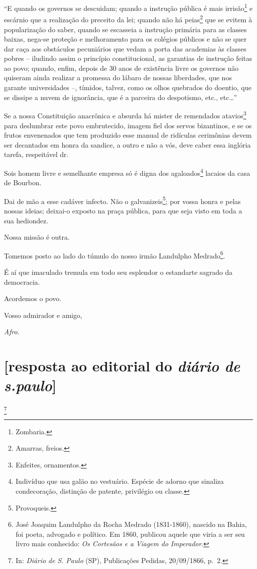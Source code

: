 ``E quando os governos se descuidam; quando a instrução pública é mais
irrisão\footnote{Zombaria.} e escárnio que a realização do preceito da
lei; quando não há peias\footnote{Amarras, freios.} que se evitem à
popularização do saber, quando se escasseia a instrução primária para as
classes baixas, nega-se proteção e melhoramento para os colégios
públicos e não se quer dar caça aos obstáculos pecuniários que vedam a
porta das academias às classes pobres -- iludindo assim o princípio
constitucional, as garantias de instrução feitas ao povo; quando, enfim,
depois de 30 anos de existência livre os governos não quiseram ainda
realizar a promessa do lábaro de nossas liberdades, que nos garante
universidades --, tímidos, talvez, como os olhos quebrados do doentio,
que se dissipe a nuvem de ignorância, que é a parceira do despotismo,
etc., etc\ldots''

Se a nossa Constituição anacrônica e absurda há mister de remendados
atavios\footnote{Enfeites, ornamentos.} para deslumbrar este povo
embrutecido, imagem fiel dos servos bizantinos, e se os frutos
envenenados que tem produzido esse manual de ridículas cerimônias devem
ser decantados em honra da sandice, a outro e não a vós, deve caber essa
inglória tarefa, respeitável dr.

Sois homem livre e semelhante empresa só é digna dos
agaloados\footnote{Indivíduo que usa galão no vestuário. Espécie de
  adorno que sinaliza condecoração, distinção de patente, privilégio ou
  classe.} lacaios da casa de Bourbon.

Dai de mão a esse cadáver infecto. Não o galvanizeis\footnote{
  Provoqueis.}; por vossa honra e pelas nossas ideias; deixai-o exposto
na praça pública, para que seja visto em toda a sua hediondez.

Nossa missão é outra.

Tomemos posto ao lado do túmulo do nosso irmão Landulpho
Medrado\footnote{José Joaquim Landulpho da Rocha Medrado (1831-1860),
  nascido na Bahia, foi poeta, advogado e político. Em 1860, publicou
  aquele que viria a ser seu livro mais conhecido: \emph{Os Cortesãos e
  a Viagem do Imperador}.}.

É aí que imaculado tremula em todo seu esplendor o estandarte sagrado da
democracia.

Acordemos o povo.

Vosso admirador e amigo,

\emph{Afro.}

\chapter{{[}resposta ao editorial do \emph{diário de s.paulo}{]}}\footnote{
  In: \emph{Diário de S. Paulo} (SP), Publicações Pedidas, 20/09/1866,
  p.~2.}

